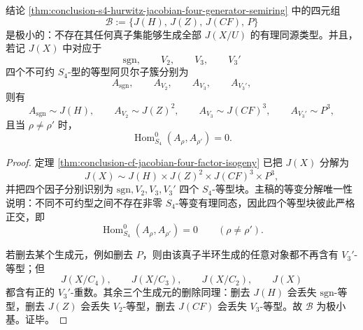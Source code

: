 \begin{theorem}[四生成元基的极小性与等变刚性]\label{thm:conclusion-s4-hurwitz-jacobian-generator-minimality}
结论 \ref{thm:conclusion-s4-hurwitz-jacobian-four-generator-semiring} 中的四元组
\[
\mathcal B:=\{J(H),\,J(Z),\,J(CF),\,P\}
\]
是极小的：不存在其任何真子集能够生成全部 \(J(X/U)\) 的有理同源类型。并且，若记 \(J(X)\) 中对应于
\[
\mathrm{sgn},\qquad V_2,\qquad V_3,\qquad V_3'
\]
四个不可约 \(S_4\)-型的等型阿贝尔子簇分别为
\[
A_{\mathrm{sgn}},\qquad A_{V_2},\qquad A_{V_3},\qquad A_{V_3'},
\]
则有
\[
A_{\mathrm{sgn}}\sim J(H),\qquad
A_{V_2}\sim J(Z)^2,\qquad
A_{V_3}\sim J(CF)^3,\qquad
A_{V_3'}\sim P^3,
\]
且当 \(\rho\neq \rho'\) 时，
\[
\operatorname{Hom}_{S_4}^0(A_\rho,A_{\rho'})=0.
\]
\end{theorem}
\begin{proof}
定理 \ref{thm:conclusion-cf-jacobian-four-factor-isogeny} 已把 \(J(X)\) 分解为
\[
J(X)\sim J(H)\times J(Z)^2\times J(CF)^3\times P^3,
\]
并把四个因子分别识别为 \(\mathrm{sgn},V_2,V_3,V_3'\) 四个 \(S_4\)-等型块。主稿的等变分解唯一性说明：不同不可约型之间不存在非零 \(S_4\)-等变有理同态，因此四个等型块彼此严格正交，即
\[
\operatorname{Hom}_{S_4}^0(A_\rho,A_{\rho'})=0
\qquad(\rho\neq\rho').
\]

若删去某个生成元，例如删去 \(P\)，则由该真子半环生成的任意对象都不再含有 \(V_3'\)-等型；但
\[
J(X/C_4),\qquad J(X/C_3),\qquad J(X/C_2),\qquad J(X)
\]
都含有正的 \(V_3'\)-重数。其余三个生成元的删除同理：删去 \(J(H)\) 会丢失 \(\mathrm{sgn}\)-等型，删去 \(J(Z)\) 会丢失 \(V_2\)-等型，删去 \(J(CF)\) 会丢失 \(V_3\)-等型。故 \(\mathcal B\) 为极小基。证毕。
\end{proof}

